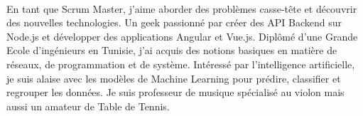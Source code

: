 

\begin{cvparagraph}\justify\

En tant que Scrum Master, j'aime aborder des problèmes casse-tête et découvrir des nouvelles technologies. Un geek passionné par créer des API Backend sur Node.js et développer des applications Angular et Vue.js. Diplômé d'une Grande Ecole d'ingénieurs en Tunisie, j'ai acquis des notions basiques en matière de réseaux, de programmation et de système. Intéressé par l'intelligence artificielle, je suis alaise avec les modèles de Machine Learning pour prédire, classifier et regrouper les données. Je suis professeur de musique spécialisé au violon mais aussi un amateur de Table de Tennis.
\end{cvparagraph}
